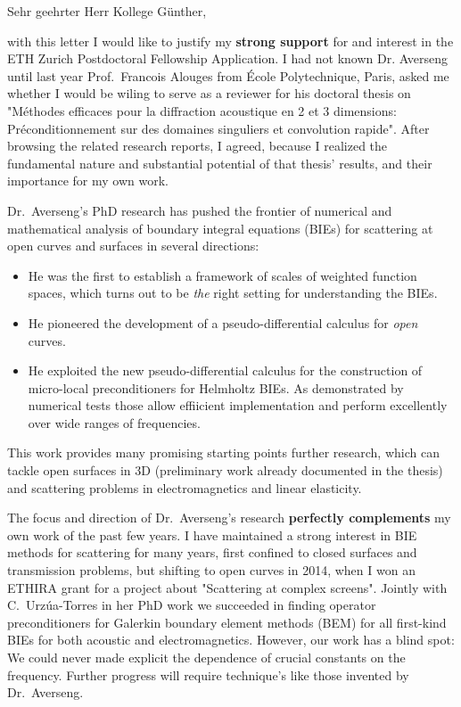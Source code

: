 \documentclass[english]{ethbrief3}
\begin{document}

\opening{Sehr geehrter Herr Kollege Günther,}

with this letter I would like to justify my \textbf{strong support} for and interest in
the ETH Zurich Postdoctoral Fellowship Application. I had not known Dr. Averseng until
last year Prof.~Francois Alouges from \'Ecole Polytechnique, Paris, asked me whether I
would be wiling to serve as a reviewer for his doctoral thesis on "Méthodes efficaces pour
la diffraction acoustique en 2 et 3 dimensions: Préconditionnement sur des domaines
singuliers et convolution rapide". After browsing the related research reports, I agreed,
because I realized the fundamental nature and substantial potential of that thesis'
results, and their importance for my own work.

Dr.~Averseng's PhD research has pushed the frontier of numerical and mathematical analysis
of boundary integral equations (BIEs) for scattering at open curves and surfaces in
several directions:
\begin{itemize}
\item He was the first to establish a framework of scales of weighted function spaces,
  which turns out to be \emph{the} right setting for understanding the BIEs.
\item He pioneered the development of a pseudo-differential calculus for \emph{open}
  curves.
\item He exploited the new pseudo-differential calculus for the construction of 
  micro-local preconditioners for Helmholtz BIEs. As demonstrated by numerical tests those
  allow effiicient implementation and perform excellently over wide ranges of frequencies.
\end{itemize}
This work provides many promising starting points further research, which can tackle open
surfaces in 3D (preliminary work already documented in the thesis) and scattering problems
in electromagnetics and linear elasticity.

The focus and direction of Dr.~Averseng's research \textbf{perfectly complements} my own
work of the past few years. I have maintained a strong interest in BIE methods for
scattering for many years, first confined to closed surfaces and transmission problems,
but shifting to open curves in 2014, when I won an ETHIRA grant for a project about
"Scattering at complex screens". Jointly with C.~Urz\'ua-Torres in her PhD work we
succeeded in finding operator preconditioners for Galerkin boundary element methods (BEM)
for all first-kind BIEs for both acoustic and electromagnetics. However, our work has a
blind spot: We could never made explicit the dependence of crucial constants on the
frequency. Further progress will require technique's like those invented by Dr.~Averseng.
\end{document}
